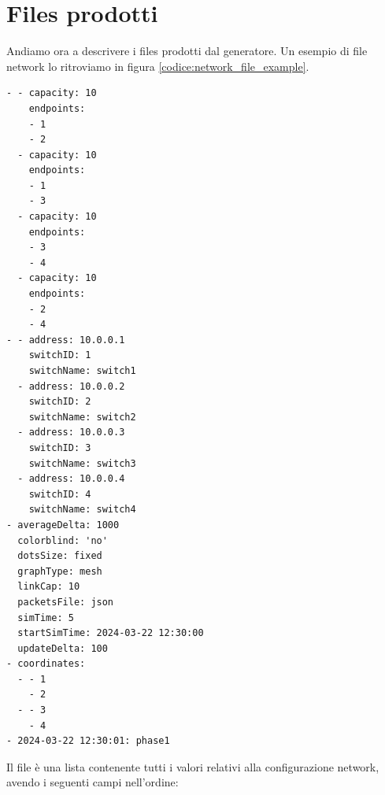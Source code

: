 \documentclass[binding=0.6cm]{sapthesis}
\begin{document}
\section{Files prodotti}
Andiamo ora a descrivere i files prodotti dal generatore. Un esempio di file network lo ritroviamo in figura \ref*{codice:network_file_example}.
{\scriptsize %
\begin{lstlisting}[caption={esempio di network file}, label={codice:network_file_example}]
- - capacity: 10
    endpoints:
    - 1
    - 2
  - capacity: 10
    endpoints:
    - 1
    - 3
  - capacity: 10
    endpoints:
    - 3
    - 4
  - capacity: 10
    endpoints:
    - 2
    - 4
- - address: 10.0.0.1
    switchID: 1
    switchName: switch1
  - address: 10.0.0.2
    switchID: 2
    switchName: switch2
  - address: 10.0.0.3
    switchID: 3
    switchName: switch3
  - address: 10.0.0.4
    switchID: 4
    switchName: switch4
- averageDelta: 1000
  colorblind: 'no'
  dotsSize: fixed
  graphType: mesh
  linkCap: 10
  packetsFile: json
  simTime: 5
  startSimTime: 2024-03-22 12:30:00
  updateDelta: 100
- coordinates:
  - - 1
    - 2
  - - 3
    - 4
- 2024-03-22 12:30:01: phase1

\end{lstlisting}
}
Il file è una lista contenente tutti i valori relativi alla configurazione network, avendo i seguenti campi nell'ordine:
\end{document}
